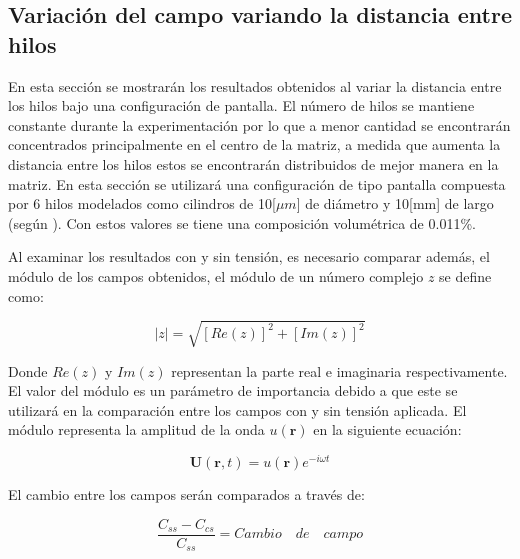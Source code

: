\documentclass[12pt,letterpaper]{article}
\numberwithin{equation}{section}
\begin{document}
\pagebreak
\subsection{Variación del campo variando la distancia entre hilos}
En esta sección se mostrarán los resultados obtenidos al variar la distancia entre los hilos bajo una configuración de pantalla. El número de hilos se mantiene constante durante la experimentación por lo que a menor cantidad se encontrarán concentrados principalmente en el centro de la matriz, a medida que aumenta la distancia entre los hilos estos se encontrarán distribuidos de mejor manera en la matriz. En esta sección se utilizará una configuración de tipo pantalla compuesta por 6 hilos modelados como cilindros de 10[$\mu m$] de diámetro y 10[mm] de largo (según \cite{Wire_theory_1}). Con estos valores se tiene una composición volumétrica de 0.011\%.

Al examinar los resultados con y sin tensión, es necesario comparar además, el módulo de los campos obtenidos, el módulo de un número complejo $z$ se define como:

$$|z| = \sqrt{\left[Re(z)\right]^2+\left[Im(z)\right]^2}$$

Donde $Re(z)$ y $Im(z)$ representan la parte real e imaginaria respectivamente. El valor del módulo es un parámetro de importancia debido a que este se utilizará en la comparación entre los campos con y sin tensión aplicada. El módulo representa la amplitud de la onda $u(\textbf{r})$ en la siguiente ecuación:

$$\textbf{U}(\textbf{r},t) = u(\textbf{r})e^{-i\omega t}$$ 

El cambio entre los campos serán comparados a través de:

$$\frac{C_{ss}-C_{cs}}{C_{ss}} = Cambio\quad de\quad campo$$
\end{document}
